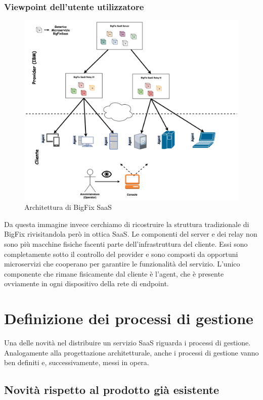 \subsubsection{Viewpoint dell'utente utilizzatore}
\begin{figure} [h!]
	\centering
	\includegraphics[width=1\linewidth]{capitoli/imgs/architectureUserViewpoint.png}
	\caption{Architettura di BigFix SaaS}
	\label{fig:uviewpoint}
\end{figure}
Da questa immagine invece cerchiamo di ricostruire la struttura tradizionale di BigFix rivisitandola però in ottica SaaS. Le componenti del server e dei relay non sono più macchine fisiche facenti parte dell'infrastruttura del cliente. Essi sono completamente sotto il controllo del provider e sono composti da opportuni microservizi che cooperano per garantire le funzionalità del servizio. L'unico componente che rimane fisicamente dal cliente è l'agent, che è presente ovviamente in ogni dispositivo della rete di endpoint.

\section{Definizione dei processi di gestione}
Una delle novità nel distribuire un servizio SaaS riguarda i processi di gestione. Analogamente alla progettazione architetturale, anche i processi di gestione vanno ben definiti e, successivamente, messi in opera.

\subsection{Novità rispetto al prodotto già esistente}

